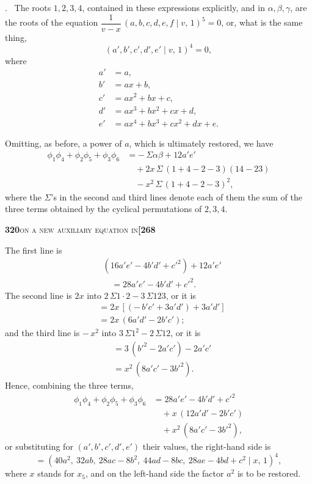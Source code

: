 \documentclass[11pt]{article}
\newcommand{\Cdel}{\mid}
\begin{document}
\medskip

. \ The roots $1, 2, 3, 4$, contained in these expressions explicitly, and in $\alpha, \beta, \gamma$, are the roots of the equation $\dfrac{1}{v - x}\,(a, b, c, d, e, f\Cdel v,\,1)^5 = 0$, or, what is the same thing,
\[
   (a', b', c', d', e'\Cdel v,\,1)^4 = 0,
\]
where
\[
\begin{aligned}
   a' &= a,\\
   b' &= a x + b,\\
   c' &= a x^2 + b x + c,\\
   d' &= a x^3 + b x^2 + c x + d,\\
   e' &= a x^4 + b x^3 + c x^2 + d x + e.
\end{aligned}
\]

\medskip

\noindent Omitting, as before, a power of $a$, which is ultimately restored, we have
\[
\begin{aligned}
   \phi_1\phi_4 + \phi_2\phi_5 + \phi_3\phi_6 &= -\,\Sigma\alpha\beta + 12 a' e'\\
   &\quad{} + 2 x\,\Sigma\,(1 + 4 - 2 - 3)(14 - 23)\\
   &\quad{} - x^2\,\Sigma\,(1 + 4 - 2 - 3)^2,
\end{aligned}
\]
where the $\Sigma$'s in the second and third lines denote each of them the sum of the three terms obtained by the cyclical permutations of $2, 3, 4$.

\newpage
\setcounter{page}{320}

\noindent\textbf{320}\hfill\textsc{on a new auxiliary equation in}\hfill\textbf{[268}

\medskip

\noindent The first line is
\[
\begin{aligned}
   &(16 a' e' - 4 b' d' + c'^2) + 12 a' e'\\
   &\quad{} = 28 a' e' - 4 b' d' + c'^2.
\end{aligned}
\]
The second line is $2 x$ into $2\,\Sigma 1\cdot 2 - 3\,\Sigma 123$,
or it is
\[
\begin{aligned}
   &= 2 x\,[(-\,b' c' + 3 a' d') + 3 a' d']\\
   &= 2 x\,(6 a' d' - 2 b' c');
\end{aligned}
\]
and the third line is $-\,x^2$ into $3\,\Sigma 1^2 - 2\,\Sigma 12$,
or it is
\[
\begin{aligned}
   &= 3\,(b'^2 - 2 a' c') - 2 a' c'\\
   &= x^2\,(8 a' c' - 3 b'^2).
\end{aligned}
\]
Hence, combining the three terms,
\[
\begin{aligned}
   \phi_1\phi_4 + \phi_2\phi_5 + \phi_3\phi_6 &= 28 a' e' - 4 b' d' + c'^2\\
   &\quad{} + x\,(12 a' d' - 2 b' c')\\
   &\quad{} + x^2\,(8 a' c' - 3 b'^2),
\end{aligned}
\]
or substituting for $(a', b', c', d', e')$ their values, the right-hand side is
\[
   = (40 a^2,\ 32 a b,\ 28 a c - 8 b^2,\ 44 a d - 8 b c,\ 28 a e - 4 b d + c^2\Cdel x,\,1)^4,
\]
where $x$ stands for $x_5$, and on the left-hand side the factor $a^2$ is to be restored.
\end{document}
